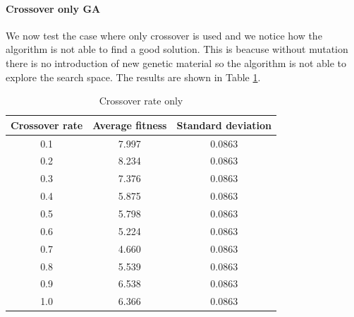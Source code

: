 \paragraph*{Crossover only GA}
We now test the case where only crossover is used and we notice how the algorithm is not able to find a good solution. This is beacuse without mutation there is no introduction of new genetic material so the algorithm is not able to explore the search space. The results are shown in Table \ref{tab:crossover_rate}.
\begin{table}
    \centering
    \begin{tabular}{|c|c|c|}
        Crossover rate & Average fitness & Standard deviation \\ \hline
        0.1            & 7.997           & 0.0863             \\
        0.2            & 8.234           & 0.0863             \\
        0.3            & 7.376           & 0.0863             \\
        0.4            & 5.875           & 0.0863             \\
        0.5            & 5.798           & 0.0863             \\
        0.6            & 5.224           & 0.0863             \\
        0.7            & 4.660           & 0.0863             \\
        0.8            & 5.539           & 0.0863             \\
        0.9            & 6.538           & 0.0863             \\
        1.0            & 6.366           & 0.0863             \\
    \end{tabular}
    \caption{Crossover rate only}
    \label{tab:crossover_rate}
\end{table}

